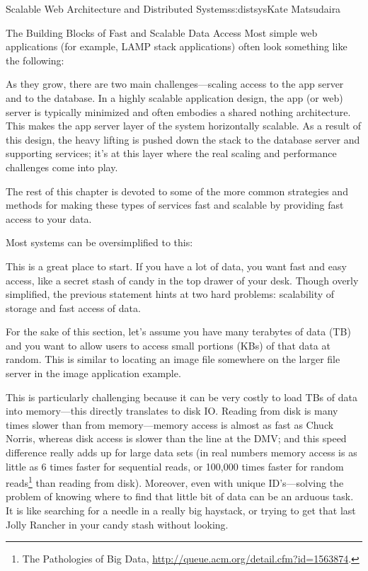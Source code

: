 \begin{aosachapter}{Scalable Web Architecture and Distributed Systems}{s:distsys}{Kate Matsudaira}
\begin{aosasect1}{The Building Blocks of Fast and Scalable Data Access}
Most simple web applications (for example, LAMP stack applications)
often look something like the following:


As they grow, there are two main challenges---scaling access to the
app server and to the database. In a highly scalable application
design, the app (or web) server is typically minimized and often
embodies a shared nothing architecture. This makes the app server
layer of the system horizontally scalable. As a result of this design,
the heavy lifting is pushed down the stack to the database server and
supporting services; it’s at this layer where the real scaling and
performance challenges come into play.

The rest of this chapter is devoted to some of the more common
strategies and methods for making these types of services fast and
scalable by providing fast access to your data.

Most systems can be oversimplified to this:


This is a great place to start. If you have a lot of data, you want
fast and easy access, like a secret stash of candy in the top drawer
of your desk. Though overly simplified, the previous statement hints
at two hard problems: scalability of storage and fast access of data.

For the sake of this section, let’s assume you have many terabytes of
data (TB) and you want to allow users to access small portions (KBs)
of that data at random. This is similar to locating an image file
somewhere on the larger file server in the image application example.


This is particularly challenging because it can be very costly to load
TBs of data into memory---this directly translates to disk IO. Reading
from disk is many times slower than from memory---memory access is
almost as fast as Chuck Norris, whereas disk access is slower than the
line at the DMV; and this speed difference really adds up for large
data sets (in real numbers memory access is as little as 6 times
faster for sequential reads, or 100,000 times faster for random
reads\footnote{The Pathologies of Big Data,
  \url{http://queue.acm.org/detail.cfm?id=1563874}.} than reading from
disk). Moreover, even with unique ID’s---solving the problem of
knowing where to find that little bit of data can be an arduous
task. It is like searching for a needle in a really big haystack, or
trying to get that last Jolly Rancher in your candy stash without
looking.


\end{aosasect1}
\end{aosachapter}
